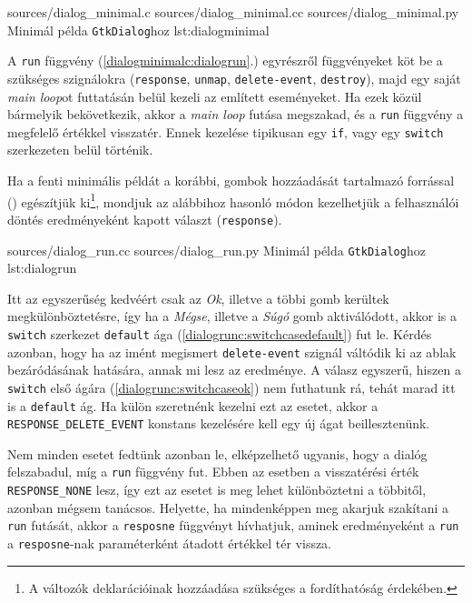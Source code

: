 \lsttriplesource
{sources/dialog_minimal.c}
{sources/dialog_minimal.cc}
{sources/dialog_minimal.py}
{Minimál példa \texttt{GtkDialog}hoz}
{lst:dialogminimal}

A \texttt{run} függvény (\ref{dialogminimalc:dialogrun}.) egyrészről függvényeket köt be a szükséges szignálokra (\texttt{response}, \texttt{unmap}, \texttt{delete-event}, \texttt{destroy}), majd egy saját \textit{main loop}ot futtatásán belül kezeli az említett eseményeket. Ha ezek közül bármelyik bekövetkezik, akkor a \textit{main loop} futása megszakad, és a \texttt{run} függvény a megfelelő értékkel visszatér. Ennek kezelése tipikusan egy \texttt{if}, vagy egy \texttt{switch} szerkezeten belül történik.

Ha a fenti minimális példát a korábbi, gombok hozzáadását tartalmazó forrással () egészítjük ki\footnote{A változók deklarációinak hozzáadása szükséges a fordíthatóság érdekében.}, mondjuk az alábbihoz hasonló módon kezelhetjük a felhasználói döntés eredményeként kapott választ (\texttt{response}).

{sources/dialog_run.cc}
{sources/dialog_run.py}
{Minimál példa \texttt{GtkDialog}hoz}
{lst:dialogrun}

Itt az egyszerűség kedvéért csak az \textit{Ok}, illetve a többi gomb kerültek megkülönböztetésre, így ha a \textit{Mégse}, illetve a \textit{Súgó} gomb aktiválódott, akkor is a \texttt{switch} szerkezet \texttt{default} ága (\ref{dialogrunc:switchcasedefault}) fut le. Kérdés azonban, hogy ha az imént megismert \texttt{delete-event} szignál váltódik ki az ablak bezáródásának hatására, annak mi lesz az eredménye. A válasz egyszerű, hiszen a \texttt{switch} első ágára (\ref{dialogrunc:switchcaseok}) nem futhatunk rá, tehát marad itt is a \texttt{default} ág. Ha külön szeretnénk kezelni ezt az esetet, akkor a \texttt{RESPONSE\_DELETE\_EVENT} konstans kezelésére kell egy új ágat beillesztenünk.

Nem minden esetet fedtünk azonban le, elképzelhető ugyanis, hogy a dialóg felszabadul, míg a \texttt{run} függvény fut. Ebben az esetben a visszatérési érték \texttt{RESPONSE\_NONE} lesz, így ezt az esetet is meg lehet különböztetni a többitől, azonban mégsem tanácsos. Helyette, ha mindenképpen meg akarjuk szakítani a \texttt{run} futását, akkor a \texttt{resposne} függvényt hívhatjuk, aminek eredményeként a \texttt{run} a \texttt{resposne}-nak paraméterként átadott értékkel tér vissza.

